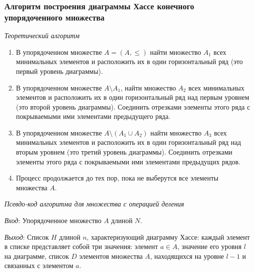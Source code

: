 \documentclass[bachelor, och, labwork]{shiza}
\begin{document}
\subsubsection{Алгоритм построения диаграммы Хассе конечного упорядоченного множества}

\begin{center}\textit{Теоретический алгоритм}\end{center}
\begin{enumerate}
    \item В упорядоченном множестве $A = (A, \leq)$ найти множество $A_1$ всех минимальных элементов и расположить их в один горизонтальный ряд (это первый уровень диаграммы).
    \item В упорядоченном множестве $A \setminus A_1$, найти множество $A_2$ всех минимальных элементов и
    расположить их в один горизонтальный ряд над первым уровнем (это второй уровень диаграммы). Соединить
    отрезками элементы этого ряда с покрываемыми ими элементами предыдущего ряда.
    \item В упорядоченном множестве $A \setminus (A_1 \cup A_2)$ найти множество $A_3$ всех минимальных
    элементов и расположить их в один горизонтальный ряд над вторым уровнем (это третий уровень диаграммы).
    Соединить отрезками элементы этого ряда с покрываемыми ими элементами предыдущих рядов.
    \item Процесс продолжается до тех пор, пока не выберутся все элементы множества $A$.
\end{enumerate}

\begin{center}\textit{Псевдо-код алгоритма для множества с операцией деления}\end{center}

\textit{Вход}: Упорядоченное множество $A$ длиной $N$.

\textit{Выход}: Список $H$ длиной $n$, характеризующий диаграмму Хассе: каждый 
элемент в списке представляет собой три значения: элемент $a \in A$, значение его 
уровня $l$ на диаграмме, список $D$ элементов множества $A$, находящихся на 
уровне $l - 1$ и связанных с элементом $a$.
\end{document}
